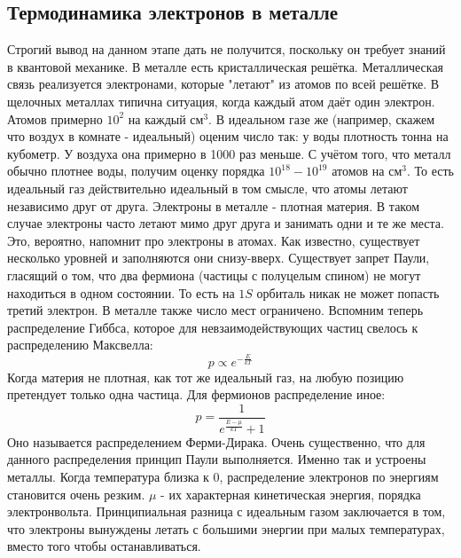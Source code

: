 \documentclass[a4paper, 12pt]{article}
\begin{document}
	\subsection{Термодинамика электронов в металле}
	Строгий вывод на данном этапе дать не получится, поскольку он требует знаний в квантовой механике. В металле есть кристаллическая решётка. Металлическая связь реализуется электронами, которые "летают" из атомов по всей решётке. В щелочных металлах типична ситуация, когда каждый атом даёт один электрон. Атомов примерно $10^{2}$ на каждый $\text{см}^{3}$. В идеальном газе же (например, скажем что воздух в комнате - идеальный) оценим число так: у воды плотность тонна на кубометр. У воздуха она примерно в 1000 раз меньше. С учётом того, что металл обычно плотнее воды, получим оценку порядка $10^{18}-10^{19}$ атомов на $\text{см}^{3}$. То есть идеальный газ действительно идеальный в том смысле, что атомы летают независимо друг от друга. Электроны в металле - плотная материя. В таком случае электроны часто летают мимо друг друга и занимать одни и те же места. Это, вероятно, напомнит про электроны в атомах. Как известно, существует несколько уровней и заполняются они снизу-вверх. Существует запрет Паули, гласящий о том, что два фермиона (частицы с полуцелым спином) не могут находиться в одном состоянии. То есть на $1S$ орбиталь никак не может попасть третий электрон. В металле также число мест ограничено. Вспомним теперь распределение Гиббса, которое для невзаимодействующих частиц свелось к распределению Максвелла:
	\begin{equation*}
		p \propto e^{-\frac{E}{kT}}
	\end{equation*}
	Когда материя не плотная, как тот же идеальный газ, на любую позицию претендует только одна частица. Для фермионов распределение иное:
	\begin{equation*}
		p = \frac{1}{e^{\frac{E-\mu}{kT}} + 1}
	\end{equation*}
	Оно называется распределением Ферми-Дирака. Очень существенно, что для данного распределения принцип Паули выполняется. Именно так и устроены металлы.  Когда температура близка к 0, распределение электронов по энергиям становится очень резким. $\mu$ - их характерная кинетическая энергия, порядка электронвольта. Принципиальная разница с идеальным газом заключается в том, что электроны вынуждены летать с большими энергии при малых температурах, вместо того чтобы останавливаться. 
\end{document}
